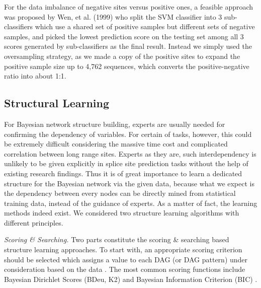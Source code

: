 \documentclass[journal,twoside]{IEEEtran}
\begin{document}
For the data imbalance of negative sites versus positive ones, a feasible approach was proposed by Wen, et al. (1999) \cite{fang1999splice} who split the SVM classifier into 3 sub-classifiers which use a shared set of positive samples but different sets of negative samples, and picked the lowest prediction score on the testing set among all 3 scores generated by sub-classifiers as the final result. Instead we simply used the oversampling strategy, as we made a copy of the positive sites to expand the positive sample size up to 4,762 sequences, which converts the positive-negative ratio into about 1:1. 

\subsection{Structural Learning}\label{2.3}

For Bayesian network structure building, experts are usually needed for confirming the dependency of variables. For certain of tasks, however, this could be extremely difficult considering the massive time cost and complicated correlation between long range sites. Experts as they are, such interdependency is unlikely to be given explicitly in splice site prediction tasks without the help of existing research findings. Thus it is of great importance to learn a dedicated structure for the Bayesian network via the given data, because what we expect is the dependency between every nodes can be directly mined from statistical training data, instead of the guidance of experts. As a matter of fact, the learning methods indeed exist. We considered two structure learning algorithms with different principles. 

\emph{Scoring \& Searching.} Two parts constitute the scoring \& searching based structure learning approaches. To start with, an appropriate scoring criterion should be selected which assigns a value to each DAG (or DAG pattern) under consideration based on the data \cite{neapolitan2004learning}. The most common scoring functions include Bayesian Dirichlet Scores (BDeu, K2) and Bayesian Information Criterion (BIC) \cite{koller2009probabilistic}. 
\end{document}
